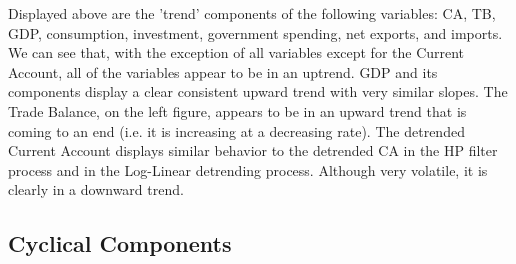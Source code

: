 \documentclass[12pt]{article}
\begin{document}
\begin{flushleft}
Displayed above are the 'trend' components of the following variables: CA, TB, GDP, consumption, investment, government spending, net exports, and imports. 
\break
\linebreak
We can see that, with the exception of all variables except for the Current Account, all of the variables appear to be in an uptrend. GDP and its components display a clear consistent upward trend with very similar slopes. The Trade Balance, on the left figure, appears to be in an upward trend that is coming to an end (i.e. it is increasing at a decreasing rate).
\break
\linebreak
The detrended Current Account displays similar behavior to the detrended CA in the HP filter process and in the Log-Linear detrending process. Although very volatile, it is clearly in a downward trend.
\end{flushleft}

\newpage

\subsection{Cyclical Components}
\end{document}
